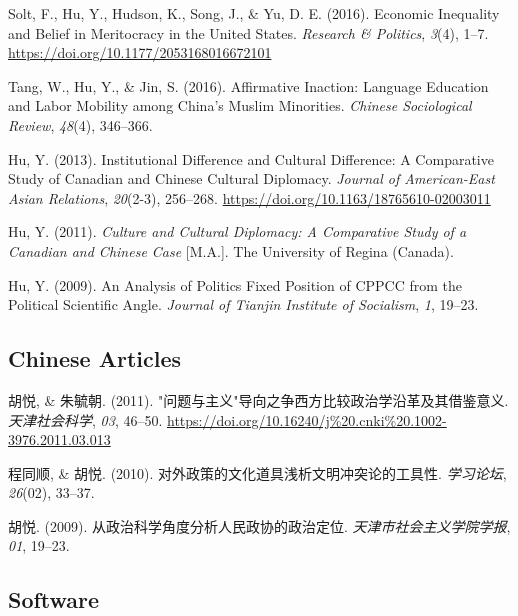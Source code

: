 \documentclass[11pt, a4paper]{awesome-cv}
\begin{document}
\leavevmode\hypertarget{ref-SoltEtAl2016}{}%
Solt, F., Hu, Y., Hudson, K., Song, J., \& Yu, D. E. (2016). Economic
Inequality and Belief in Meritocracy in the United States.
\emph{Research \& Politics}, \emph{3}(4), 1--7.
\url{https://doi.org/10.1177/2053168016672101}

\leavevmode\hypertarget{ref-TangEtAl2016a}{}%
Tang, W., Hu, Y., \& Jin, S. (2016). Affirmative Inaction: Language
Education and Labor Mobility among China's Muslim Minorities.
\emph{Chinese Sociological Review}, \emph{48}(4), 346--366.

\leavevmode\hypertarget{ref-Hu2013}{}%
Hu, Y. (2013). Institutional Difference and Cultural Difference: A
Comparative Study of Canadian and Chinese Cultural Diplomacy.
\emph{Journal of American-East Asian Relations}, \emph{20}(2-3),
256--268. \url{https://doi.org/10.1163/18765610-02003011}

\leavevmode\hypertarget{ref-Hu2011}{}%
Hu, Y. (2011). \emph{Culture and Cultural Diplomacy: A Comparative Study
of a Canadian and Chinese Case} {[}M.A.{]}. The University of Regina
(Canada).

\leavevmode\hypertarget{ref-Hu2009}{}%
Hu, Y. (2009). An Analysis of Politics Fixed Position of CPPCC from the
Political Scientific Angle. \emph{Journal of Tianjin Institute of
Socialism}, \emph{1}, 19--23.

\endgroup

\hypertarget{chinese-articles}{%
\subsection{Chinese Articles}\label{chinese-articles}}

\begingroup
\setlength{\parindent}{-0.5in}
\setlength{\leftskip}{0.5in}

\hypertarget{refs_chinese}{}
\leavevmode\hypertarget{ref-HuYueZhuYuZhao2011}{}%
胡悦, \& 朱毓朝. (2011).
"问题与主义"导向之争西方比较政治学沿革及其借鉴意义. \emph{天津社会科学},
\emph{03}, 46--50.
\url{https://doi.org/10.16240/j\%20.cnki\%20.1002-3976.2011.03.013}

\leavevmode\hypertarget{ref-ChengTongShunHuYue2010}{}%
程同顺, \& 胡悦. (2010). 对外政策的文化道具浅析文明冲突论的工具性.
\emph{学习论坛}, \emph{26}(02), 33--37.

\leavevmode\hypertarget{ref-HuYue2009}{}%
胡悦. (2009). 从政治科学角度分析人民政协的政治定位.
\emph{天津市社会主义学院学报}, \emph{01}, 19--23.

\endgroup

\hypertarget{software}{%
\subsection{Software}\label{software}}
\end{document}
